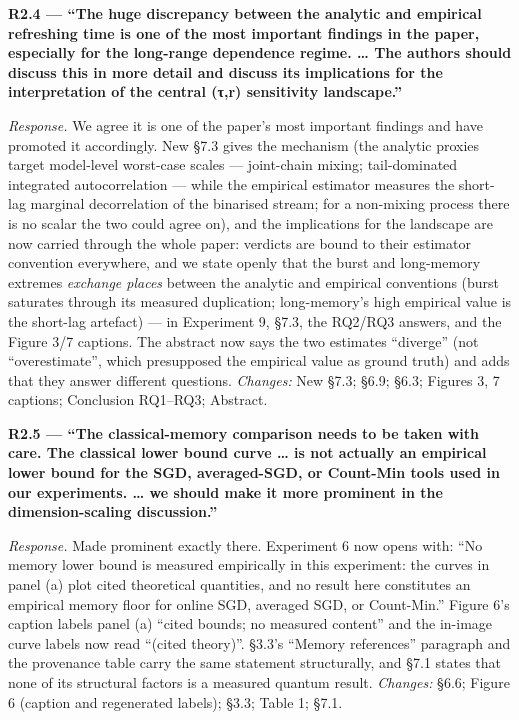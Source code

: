 \documentclass[
  11pt,
]{article}
\begin{document}
\textbf{R2.4 --- ``The huge discrepancy between the analytic and
empirical refreshing time is one of the most important findings in the
paper, especially for the long-range dependence regime. \ldots{} The
authors should discuss this in more detail and discuss its implications
for the interpretation of the central (τ,r) sensitivity landscape.''}

\emph{Response.} We agree it is one of the paper's most important
findings and have promoted it accordingly. New §7.3 gives the mechanism
(the analytic proxies target model-level worst-case scales ---
joint-chain mixing; tail-dominated integrated autocorrelation --- while
the empirical estimator measures the short-lag marginal decorrelation of
the binarised stream; for a non-mixing process there is no scalar the
two could agree on), and the implications for the landscape are now
carried through the whole paper: verdicts are bound to their estimator
convention everywhere, and we state openly that the burst and
long-memory extremes \emph{exchange places} between the analytic and
empirical conventions (burst saturates through its measured duplication;
long-memory's high empirical value is the short-lag artefact) --- in
Experiment 9, §7.3, the RQ2/RQ3 answers, and the Figure 3/7 captions.
The abstract now says the two estimates ``diverge'' (not
``overestimate'', which presupposed the empirical value as ground truth)
and adds that they answer different questions. \emph{Changes:} New §7.3;
§6.9; §6.3; Figures 3, 7 captions; Conclusion RQ1--RQ3; Abstract.

\textbf{R2.5 --- ``The classical-memory comparison needs to be taken
with care. The classical lower bound curve \ldots{} is not actually an
empirical lower bound for the SGD, averaged-SGD, or Count-Min tools used
in our experiments. \ldots{} we should make it more prominent in the
dimension-scaling discussion.''}

\emph{Response.} Made prominent exactly there. Experiment 6 now opens
with: ``No memory lower bound is measured empirically in this
experiment: the curves in panel (a) plot cited theoretical quantities,
and no result here constitutes an empirical memory floor for online SGD,
averaged SGD, or Count-Min.'' Figure 6's caption labels panel (a)
``cited bounds; no measured content'' and the in-image curve labels now
read ``(cited theory)''. §3.3's ``Memory references'' paragraph and the
provenance table carry the same statement structurally, and §7.1 states
that none of its structural factors is a measured quantum result.
\emph{Changes:} §6.6; Figure 6 (caption and regenerated labels); §3.3;
Table 1; §7.1.
\end{document}
